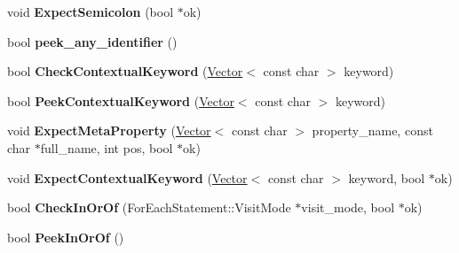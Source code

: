 \begin{DoxyCompactItemize}
\item 
void {\bfseries Expect\+Semicolon} (bool $\ast$ok)\hypertarget{classv8_1_1internal_1_1_parser_base_aaf8a578f159f217aa7730352d78ffef4}{}\label{classv8_1_1internal_1_1_parser_base_aaf8a578f159f217aa7730352d78ffef4}

\item 
bool {\bfseries peek\+\_\+any\+\_\+identifier} ()\hypertarget{classv8_1_1internal_1_1_parser_base_a34037141c7d421551bb8dc4814699a74}{}\label{classv8_1_1internal_1_1_parser_base_a34037141c7d421551bb8dc4814699a74}

\item 
bool {\bfseries Check\+Contextual\+Keyword} (\hyperlink{classv8_1_1internal_1_1_vector}{Vector}$<$ const char $>$ keyword)\hypertarget{classv8_1_1internal_1_1_parser_base_a98f48663f99354c06e5f3c7fe8edea2c}{}\label{classv8_1_1internal_1_1_parser_base_a98f48663f99354c06e5f3c7fe8edea2c}

\item 
bool {\bfseries Peek\+Contextual\+Keyword} (\hyperlink{classv8_1_1internal_1_1_vector}{Vector}$<$ const char $>$ keyword)\hypertarget{classv8_1_1internal_1_1_parser_base_a01197890dd07d16a792fa6700cc5874e}{}\label{classv8_1_1internal_1_1_parser_base_a01197890dd07d16a792fa6700cc5874e}

\item 
void {\bfseries Expect\+Meta\+Property} (\hyperlink{classv8_1_1internal_1_1_vector}{Vector}$<$ const char $>$ property\+\_\+name, const char $\ast$full\+\_\+name, int pos, bool $\ast$ok)\hypertarget{classv8_1_1internal_1_1_parser_base_ad831f7908614099b11b526c045bd9bf8}{}\label{classv8_1_1internal_1_1_parser_base_ad831f7908614099b11b526c045bd9bf8}

\item 
void {\bfseries Expect\+Contextual\+Keyword} (\hyperlink{classv8_1_1internal_1_1_vector}{Vector}$<$ const char $>$ keyword, bool $\ast$ok)\hypertarget{classv8_1_1internal_1_1_parser_base_ae5f8aeec834f3ff0542973f85cbb0812}{}\label{classv8_1_1internal_1_1_parser_base_ae5f8aeec834f3ff0542973f85cbb0812}

\item 
bool {\bfseries Check\+In\+Or\+Of} (For\+Each\+Statement\+::\+Visit\+Mode $\ast$visit\+\_\+mode, bool $\ast$ok)\hypertarget{classv8_1_1internal_1_1_parser_base_af790adfc461714756b2702d2bd50210a}{}\label{classv8_1_1internal_1_1_parser_base_af790adfc461714756b2702d2bd50210a}

\item 
bool {\bfseries Peek\+In\+Or\+Of} ()\hypertarget{classv8_1_1internal_1_1_parser_base_a7d169f07e646e05cca534cefa7c30376}{}\label{classv8_1_1internal_1_1_parser_base_a7d169f07e646e05cca534cefa7c30376}


\end{DoxyCompactItemize}
